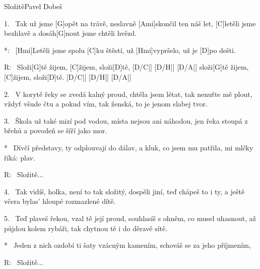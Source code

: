 \begin{song}{Složitě}{Pavel Dobeš}

\begin{xverse}{1.~}
Tak už jsme [G]opět na trávě,
neslavně [Ami]skončil ten náš let,
[C]letěli jsme bezhlavě
a dosáh[G]nout jsme chtěli hvězd.
\end{xverse}

\begin{xverse}{*:~}
[Hmi]Letěli jsme spolu [C]ku štěstí,
už [Hmi]vypršelo, už je [D]po dešti.
\end{xverse}

\begin{xverse}{R:~}
Složi[G]tě žijem, [C]{ži}jem, složi[D]tě, [D/C|]{} [D/H|]{} [D/A|]{}
složi[G]tě žijem, [C]{ži}jem, složi[D]tě. [D/C|]{} [D/H|]{} [D/A|]{}
\end{xverse}

\begin{xverse}{2.~}
V korytě řeky se zvedá kalný proud,
chtěla jsem létat, tak nenuťte mě plout,
vždyť všude čtu a pokud vím,
tak ženská, to je jenom slabej tvor.
\end{xverse}

\begin{xverse}{3.~}
Škola už také mizí pod vodou,
místa nejsou ani náhodou,
jen řeka stoupá z břehů
a povodeň se šíří jako mor.
\end{xverse}

\begin{xverse}{*~}
Dívčí představy, ty odplouvají do dálav,
a kluk, co jsem mu patřila, mi mlčky říká: plav.
\end{xverse}

\begin{xverse}{R:~}
Složitě...
\end{xverse}

\begin{xverse}{4.~}
Tak vidíš, holka, není to tak složitý,
dospěli jiní, teď chápeš to i ty,
a ještě včera bylas' hloupé rozmazlené dítě.
\end{xverse}

\begin{xverse}{5.~}
Teď plaveš řekou, vzal tě její proud,
souhlasíš s ohněm, co musel uhasnout,
až půjdou kolem rybáři, tak chytnou tě i do děravě sítě.
\end{xverse}

\begin{xverse}{*~}
Jeden z nich ozdobí ti šaty vzácným kamením,
schováš se za jeho příjmením,
\end{xverse}

\begin{xverse}{R:~}
Složitě...
\end{xverse}
\end{song}


